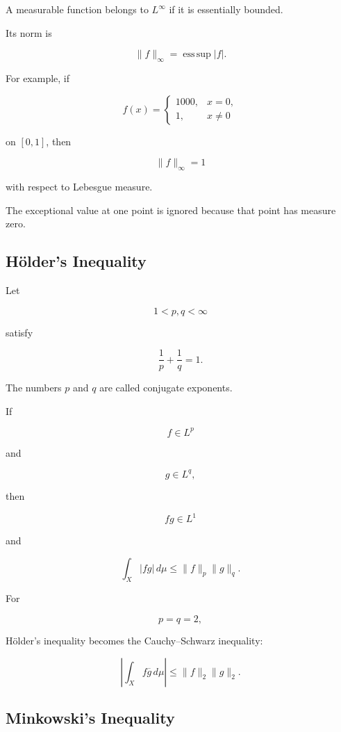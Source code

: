 A measurable function belongs to \(L^\infty\) if it is essentially
bounded.

Its norm is

\[
\boxed{
\|f\|_\infty
=
\operatorname*{ess\,sup}|f|.
}
\]

For example, if

\[
f(x)=
\begin{cases}
1000, & x=0,\\
1, & x\neq0
\end{cases}
\]

on \([0,1]\), then

\[
\boxed{
\|f\|_\infty=1
}
\]

with respect to Lebesgue measure.

The exceptional value at one point is ignored because that point has
measure zero.

\subsection{H\"older's Inequality}
\label{subsec:holders-inequality}

Let

\[
1<p,q<\infty
\]

satisfy

\[
\boxed{
\frac1p+\frac1q=1.
}
\]

The numbers \(p\) and \(q\) are called conjugate exponents.

\begin{theorem}
If

\[
f\in L^p
\]

and

\[
g\in L^q,
\]

then

\[
fg\in L^1
\]

and

\[
\boxed{
\int_X|fg|\,d\mu
\leq
\|f\|_p\|g\|_q.
}
\]
\end{theorem}

For

\[
p=q=2,
\]

H\"older's inequality becomes the Cauchy--Schwarz inequality:

\[
\boxed{
\left|
\int_Xf\overline{g}\,d\mu
\right|
\leq
\|f\|_2\|g\|_2.
}
\]

\subsection{Minkowski's Inequality}
\label{subsec:minkowski-inequality}

